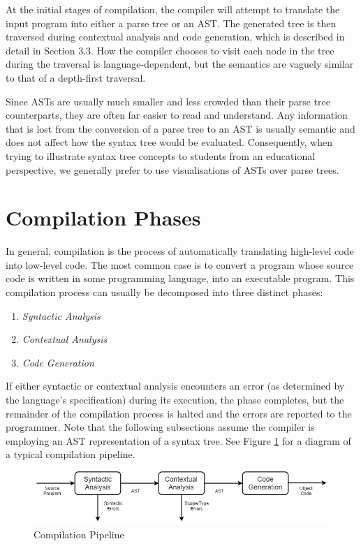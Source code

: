 \documentclass{l4proj}
\begin{document}
At the initial stages of compilation, the compiler will attempt to translate the input program into either a parse tree or an AST. The generated tree is then traversed during contextual analysis and code generation, which is described in detail in Section 3.3. How the compiler chooses to visit each node in the tree during the traversal is language-dependent, but the semantics are vaguely similar to that of a depth-first traversal. 

Since ASTs are usually much smaller and less crowded than their parse tree counterparts, they are often far easier to read and understand. Any information that is lost from the conversion of a parse tree to an AST is usually semantic and does not affect how the syntax tree would be evaluated. Consequently, when trying to illustrate syntax tree concepts to students from an educational perspective, we generally prefer to use visualisations of ASTs over parse trees.

\section{Compilation Phases}
In general, compilation is the process of automatically translating high-level code into low-level code. The most common case is to convert a program whose source code is written in some programming language, into an executable program. This compilation process can usually be decomposed into three distinct phases: 
\begin{enumerate}[label=\alph*)]
\item \textit {Syntactic Analysis}
\item \textit {Contextual Analysis}
\item \textit {Code Generation}
\end{enumerate}
If either syntactic or contextual analysis encounters an error (as determined by the language's specification) during its execution, the phase completes, but the remainder of the compilation process is halted and the errors are reported to the programmer. Note that the following subsections assume the compiler is employing an AST representation of a syntax tree. See Figure \ref{fig:compilation-pipeline} for a diagram of a typical compilation pipeline.

\begin{figure}[h]
\centering
\includegraphics[scale=0.5]{images/3-2a.png}
\caption{Compilation Pipeline}
\label{fig:compilation-pipeline}	
\end{figure}
\end{document}
